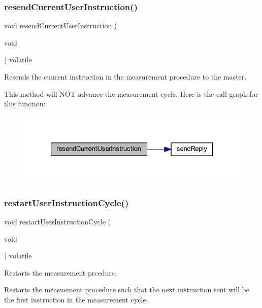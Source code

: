 \subsubsection{\texorpdfstring{resendCurrentUserInstruction()}{resendCurrentUserInstruction()}}
{\footnotesize\ttfamily void resend\+Current\+User\+Instruction (\begin{DoxyParamCaption}\item[{void}]{ }\end{DoxyParamCaption}) volatile}



Resends the cuurent instruction in the measurement procedure to the master. 

This method will N\+OT advance the measurement cycle. Here is the call graph for this function\+:
\nopagebreak
\begin{figure}[H]
\begin{center}
\leavevmode
\includegraphics[width=321pt]{class_master_a8a9c9670d31af14e65157879963e0cf1_cgraph}
\end{center}
\end{figure}
\mbox{\label{class_master_ad50d30dbd09d40661bbdbc1527ff07bf}} 
\subsubsection{\texorpdfstring{restartUserInstructionCycle()}{restartUserInstructionCycle()}}
{\footnotesize\ttfamily void restart\+User\+Instruction\+Cycle (\begin{DoxyParamCaption}\item[{void}]{ }\end{DoxyParamCaption}) volatile}



Restarts the measurement prcedure. 

Restarts the measuement procedure such that the next instruction sent will be the first instruction in the measurement cycle. \mbox{\label{class_master_a7e73d29d4d8d714b9c5ea69f18cad396}} 
